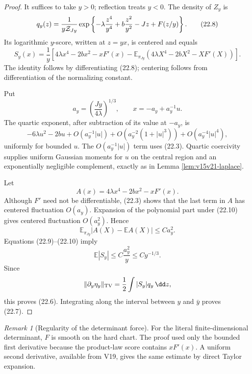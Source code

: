 \documentclass[11pt]{article}
\theoremstyle{remark}
\newtheorem{remark}[theorem]{Remark}
\begin{document}
\begin{proof}
It suffices to take \(y>0\); reflection treats \(y<0\).
The density of \(Z_y\) is
\[
 q_y(z)
 =
 \frac{1}{y{\cal Z}_{Jy}}
 \exp\left\{
 -\lambda\frac{z^4}{y^4}
 +b\frac{z^2}{y^2}
 -Jz+F(z/y)
 \right\}.                                                  \tag{22.8}
\]
Its logarithmic \(y\)-score, written at \(z=yx\), is centered and
equals
\[
 S_y(x)
 =
 \frac1y
 \left[
 4\lambda x^4-2bx^2-xF'(x)
 -\mathbb E_{\pi_{Jy}}
  (4\lambda X^4-2bX^2-XF'(X))
 \right].                                                   \tag{22.9}
\]
The identity follows by differentiating (22.8); centering follows
from differentiation of the normalizing constant.

Put
\[
 a_y=\left(\frac{Jy}{4\lambda}\right)^{1/3},
 \qquad x=-a_y+a_y^{-1}u.                                  \tag{22.10}
\]
The quartic exponent, after subtraction of its value at
\(-a_y\), is
\[
 -6\lambda u^2-2bu+O(a_y^{-1}|u|)
 +O(a_y^{-2}(1+|u|^3))
 +O(a_y^{-4}|u|^4),                                        \tag{22.11}
\]
uniformly for bounded \(u\).  The \(O(a_y^{-1}|u|)\) term uses
(22.3).  Quartic coercivity supplies uniform Gaussian moments for
\(u\) on the central region and an exponentially negligible
complement, exactly as in Lemma
\ref{lem:v15v21-laplace}.

Let
\[
 A(x)=4\lambda x^4-2bx^2-xF'(x).
\]
Although \(F'\) need not be differentiable, (22.3) shows that the
last term in \(A\) has centered fluctuation \(O(a_y)\).
Expansion of the polynomial part under (22.10) gives centered
fluctuation \(O(a_y^2)\).  Hence
\[
 \mathbb E_{\pi_{Jy}}|A(X)-\mathbb EA(X)|
 \le C a_y^2.                                               \tag{22.12}
\]
Equations (22.9)--(22.10) imply
\[
 \mathbb E|S_y|
 \le C\frac{a_y^2}{y}
 \le C y^{-1/3}.                                            \tag{22.13}
\]
Since
\[
 \|\partial_y\eta_y\|_{\rm TV}
 =\frac12\int|S_y|q_y\,\dd z,
\]
this proves (22.6).  Integrating along the interval between
\(y\) and \(\bar y\) proves (22.7).
\end{proof}

\begin{remark}[Regularity of the determinant force]
\label{rem:v15v22-regularity}
For the literal finite-dimensional determinant,
\(F\) is smooth on the hard chart.  The proof used only the bounded
first derivative because the product-law score contains
\(xF'(x)\).  A uniform second derivative, available from V19,
gives the same estimate by direct Taylor expansion.
\end{remark}
\end{document}
